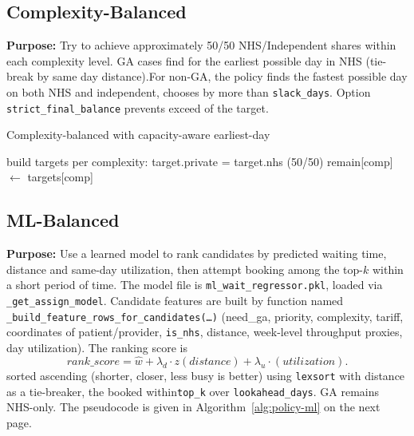 \documentclass[ %
                    author={Nattanan Nawakitbamrung},
                supervisor={Dr. Sébastien Rochat},
                    degree={MSc},
                     title={Developing and Evaluating the Impact of a Single Patient Treatment List (PTL) for an NHS Integrated Care System},
                  subtitle={},
                      type={},
                      year={2025}]{dissertation}
\begin{document}
\subsection{Complexity-Balanced}
\textbf{Purpose:} Try to achieve approximately 50/50 NHS/Independent shares within each complexity level. GA cases find for the earliest possible day in NHS (tie-break by same day distance).For non-GA, the policy finds the fastest possible day on both NHS and independent, chooses by more than \texttt{slack\_days}. Option \texttt{strict\_final\_balance} prevents exceed of the target. 

\begin{algorithm}[htbp]
\caption{Complexity-balanced with capacity-aware earliest-day}
\label{alg:policy-com-balance}
build targets per complexity: target.private = target.nhs (50/50)\;
remain[comp] $\leftarrow$ targets[comp]\;

\end{algorithm}


\subsection{ML-Balanced}
\textbf{Purpose:} Use a learned model to rank candidates by predicted waiting time, distance and same-day utilization, then attempt booking among the top-$k$ within a short period of time. The model file is \texttt{ml\_wait\_regressor.pkl}, loaded via \texttt{\_get\_assign\_model}. Candidate features are built by function named \texttt{\_build\_feature\_rows\_for\_candidates(…)} (need\_ga, priority, complexity, tariff, coordinates of patient/provider, \texttt{is\_nhs}, distance, week-level throughput proxies, day utilization). The ranking score is
\[
rank\_score = \hat{w} + \lambda_d \cdot z(distance) + \lambda_u \cdot(utilization).
\]
sorted ascending (shorter, closer, less busy is better) using \texttt{lexsort} with distance as a tie-breaker, the booked within\texttt{top\_k} over \texttt{lookahead\_days}. GA remains NHS-only. The pseudocode is given in Algorithm~\ref{alg:policy-ml} on the next page. 
\end{document}
